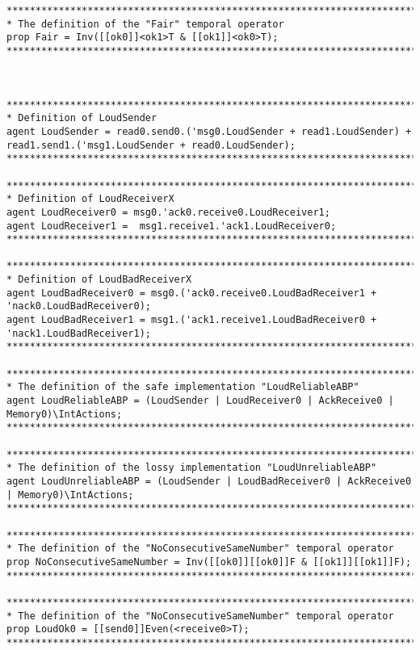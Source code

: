 \begin{lstlisting}[breaklines]
*******************************************************************************
* The definition of the "Fair" temporal operator
prop Fair = Inv([[ok0]]<ok1>T & [[ok1]]<ok0>T);
*******************************************************************************



*******************************************************************************
* Definition of LoudSender
agent LoudSender = read0.send0.('msg0.LoudSender + read1.LoudSender) + read1.send1.('msg1.LoudSender + read0.LoudSender);
*******************************************************************************

*******************************************************************************
* Definition of LoudReceiverX
agent LoudReceiver0 = msg0.'ack0.receive0.LoudReceiver1;
agent LoudReceiver1 =  msg1.receive1.'ack1.LoudReceiver0;
*******************************************************************************

*******************************************************************************
* Definition of LoudBadReceiverX
agent LoudBadReceiver0 = msg0.('ack0.receive0.LoudBadReceiver1 + 'nack0.LoudBadReceiver0);
agent LoudBadReceiver1 = msg1.('ack1.receive1.LoudBadReceiver0 + 'nack1.LoudBadReceiver1);
*******************************************************************************

*******************************************************************************
* The definition of the safe implementation "LoudReliableABP"
agent LoudReliableABP = (LoudSender | LoudReceiver0 | AckReceive0 | Memory0)\IntActions;
*******************************************************************************

*******************************************************************************
* The definition of the lossy implementation "LoudUnreliableABP"
agent LoudUnreliableABP = (LoudSender | LoudBadReceiver0 | AckReceive0 | Memory0)\IntActions;
*******************************************************************************

*******************************************************************************
* The definition of the "NoConsecutiveSameNumber" temporal operator
prop NoConsecutiveSameNumber = Inv([[ok0]][[ok0]]F & [[ok1]][[ok1]]F);
*******************************************************************************

*******************************************************************************
* The definition of the "NoConsecutiveSameNumber" temporal operator
prop LoudOk0 = [[send0]]Even(<receive0>T);
*******************************************************************************


\end{lstlisting}

